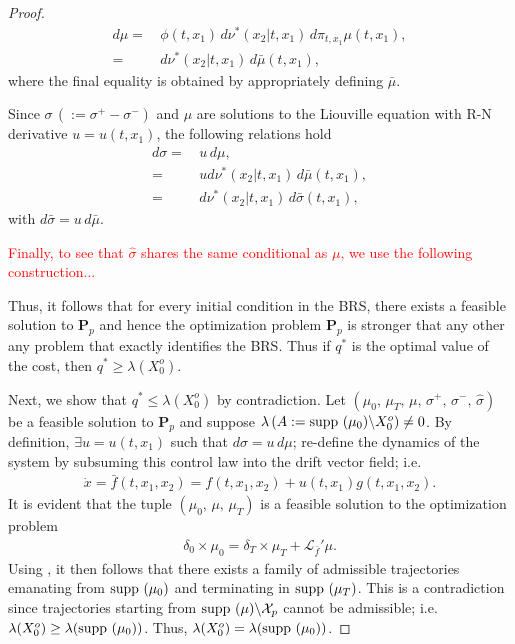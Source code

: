 \documentclass[dvipsnames]{article}
\providecommand{\supp}{\ensuremath \text{supp }}
\begin{document}
\begin{proof}
\begin{align*}
\label{eq:domination:conditional:2}
   d\mu =&\,\phi(t,x_1)\,d\nu^*(x_2|t,x_1)\,d\pi_{t,x_1}\mu(t,x_1),\\\nonumber
    =&\,d\nu^*(x_2|t,x_1)\,d\bar\mu(t,x_1),
\end{align*}
where the final equality is obtained by appropriately defining $\bar\mu$.
\par
Since $\sigma\,(:=\sigma^+-\sigma^-)$ and $\mu$ are solutions to the Liouville equation with R-N derivative \mbox{$u=u(t,x_1)$}, the following relations hold
\begin{align*}
  d\sigma=&\,u\,d\mu,\\
  =&\,ud\nu^*(x_2|t,x_1)\,d\bar\mu(t,x_1),\\
  =&\,d\nu^*(x_2|t,x_1)\,d\bar\sigma(t,x_1),
\end{align*}
with $d\bar \sigma=u\,d\bar\mu$.\par
\textcolor{red}{Finally, to see that $\hat\sigma$ shares the same conditional as $\mu$, we use the following construction...}
\par
Thus, it follows that for every initial condition in the BRS, there exists a feasible solution to {\bf P$_p$} and hence the optimization problem {\bf P$_p$} is stronger that any other any problem that exactly identifies the BRS. Thus if $q^*$ is the optimal value of the cost, then $q^*\ge \lambda(X_0^o)$.
\par
Next, we show that $q^*\le \lambda(X_0^o)$ by contradiction. Let $(\mu_0,\,\mu_T,\,\mu,\,\sigma^+,\,\sigma^-,\,\hat\sigma)$ be a feasible solution to {\bf P$_p$} and suppose $\lambda\,(A:=\supp(\mu_0)\backslash X_0^o)\ne 0$. By definition, $\exists u=u(t,x_1)$ such that $d\sigma=u\,d\mu$; re-define the dynamics of the system by subsuming this control law into the drift vector field; i.e.
\begin{align*}
  \dot x=\bar f(t,x_1,x_2)=f(t,x_1,x_2)+u(t,x_1)g(t,x_1,x_2).
\end{align*}
It is evident that the tuple $(\mu_0,\,\mu,\,\mu_T)$ is a feasible solution to the optimization problem
\begin{align*}
  \delta_0\times \mu_0=\delta_T\times \mu_T+\mathcal L_{\bar f}'\mu.
\end{align*}
Using \cite[Lemma 3]{Henrion}, it then follows that there exists a family of admissible trajectories emanating from $\supp(\mu_0)$ and terminating in $\supp(\mu_T)$. This is a contradiction since trajectories starting from $\supp(\mu)\backslash \mathcal X_p$ cannot be admissible; i.e. $\lambda(X_0^o)\ge \lambda(\supp(\mu_0))$. Thus, $\lambda(X^o_0)=\lambda(\supp (\mu_0))$.
\end{proof}
\end{document}
